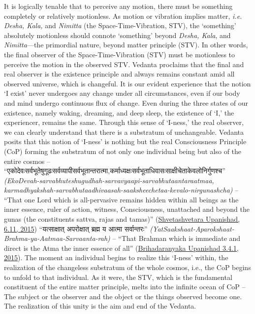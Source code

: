 \documentclass[twoside, 13pt]{article}
\begin{document}
{{It is logically tenable that to perceive any motion, there must be something completely or relatively motionless. As motion or vibration implies matter, \textit{i.e. Desha, Kala,} and \textit{Nimitta} (the Space-Time-Vibration, STV), the ‘something’ absolutely motionless should connote ‘something’ beyond \textit{Desha, Kala}, and \textit{Nimitta}—the primordial nature, beyond matter principle (STV). In other words, the final observer of the Space-Time-Vibration (STV) must be motionless to perceive the motion in the observed STV. Vedanta proclaims that the final and real observer is the existence principle and always remains constant amid all observed universe, which is changeful. It is our evident experience that the notion ‘I exist’ never undergoes any change under all circumstances, even if our body and mind undergo continuous flux of change. Even during the three states of our existence, namely waking, dreaming, and deep sleep, the existence of ‘I,’ the experiencer, remains the same. Through this sense of ‘I-ness,’ the real observer, we can clearly understand that there is a substratum of unchangeable. Vedanta posits that this notion of ‘I-ness’ is nothing but the real Consciousness Principle (CoP) forming the substratum of not only one individual being but also of the entire cosmos – \foreignlanguage{hindi}{{\fontsize{9}{11}\selectfont “एकोदेवःसर्वभूतेषुगूढःसर्वव्यापीसर्वभूतान्तरात्मा,\break  कर्माध्यक्षःसर्वभूताधिवासःसाक्षीचेताकेवलोनिर्गुणश्च”}} \textit{(EkoDevah-sarvabhuteshugudhah-sarvavyaapi-sarvabh\-utaantaraatmaa, karmadhyakshah-sarvabhutaadhivaasah-saaksheechetaa-kevalo-nirgun\-ashcha)} – “That one Lord which is all-pervasive remains hidden within all beings as the inner essence, ruler of action, witness, Consciousness, unattached and beyond the gunas (the constituents sattva, rajas and tamas)” (\underline{Shvetashvetara Upanishad, 6.11, 2015}) \foreignlanguage{hindi}{{\fontsize{9}{11}\selectfont“यत्साक्षात् अपरोक्षात् ब्रह्म य आत्मा सर्वान्तरः”}} \textit{(YatSaakshaat-Aparokshaat-Brahma-ya-Aatmaa-Sarvaanta-\break rah)} – “That Brahman which is immediate and direct is the Atma the inner essence of all” (\underline{Brihadaranyaka Upanishad 3.4.1, 2015}). The moment an individual begins to realize this ‘I-ness’ within, the realization of the changeless substratum of the whole cosmos, i.e., the CoP begins to unfold to that individual. As it were, the STV, which is the fundamental constituent of the entire matter principle, melts into the infinite ocean of CoP – The subject or the observer and the object or the things observed become one. The realization of this unity is the aim and end of the Vedanta. 

}}
\end{document}
